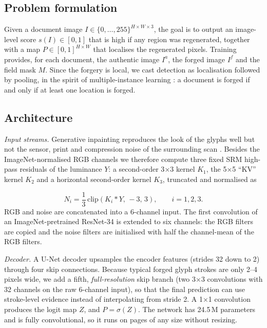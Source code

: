 \documentclass[conference]{IEEEtran}
\begin{document}
\subsection{Problem formulation}
Given a document image $I \in \{0,\ldots,255\}^{H\times W\times 3}$, the goal is to output an image-level score $s(I)\in[0,1]$ that is high if any region was regenerated, together with a map $P\in[0,1]^{H\times W}$ that localises the regenerated pixels. Training provides, for each document, the authentic image $I^{a}$, the forged image $I^{f}$ and the field mask $M$. Since the forgery is local, we cast detection as localisation followed by pooling, in the spirit of multiple-instance learning \cite{mil}: a document is forged if and only if at least one location is forged.

\subsection{Architecture}
\emph{Input streams.} Generative inpainting reproduces the look of the glyphs well but not the sensor, print and compression noise of the surrounding scan \cite{hpfcn}. Besides the ImageNet-normalised RGB channels we therefore compute three fixed SRM high-pass residuals \cite{srm,rgbn} of the luminance $Y$: a second-order 3$\times$3 kernel $K_1$, the 5$\times$5 ``KV'' kernel $K_2$ and a horizontal second-order kernel $K_3$, truncated and normalised as

\begin{equation}
N_i = \frac{1}{3}\,\mathrm{clip}\left(K_i * Y,\,-3,\,3\right),\qquad i=1,2,3.
\label{eq:srm}
\end{equation}
RGB and noise are concatenated into a 6-channel input. The first convolution of an ImageNet-pretrained \cite{imagenet} ResNet-34 \cite{resnet} is extended to six channels: the RGB filters are copied and the noise filters are initialised with half the channel-mean of the RGB filters.

\emph{Decoder.} A U-Net decoder \cite{unet} upsamples the encoder features (strides 32 down to 2) through four skip connections. Because typical forged glyph strokes are only 2--4 pixels wide, we add a fifth, \emph{full-resolution} skip branch (two 3$\times$3 convolutions with 32 channels on the raw 6-channel input), so that the final prediction can use stroke-level evidence instead of interpolating from stride 2. A 1$\times$1 convolution produces the logit map $Z$, and $P=\sigma(Z)$. The network has 24.5\,M parameters and is fully convolutional, so it runs on pages of any size without resizing.
\end{document}
